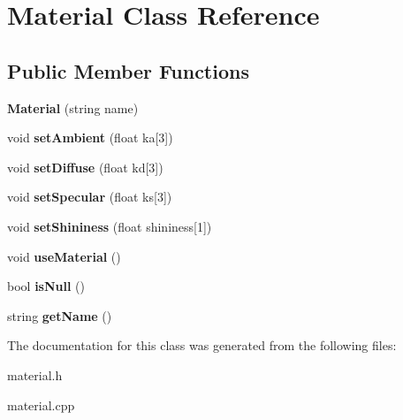 \hypertarget{classMaterial}{\section{Material Class Reference}
\label{classMaterial}
}
\subsection*{Public Member Functions}
\begin{DoxyCompactItemize}
\item 
\hypertarget{classMaterial_a20a0a97e11476bca8682f2c0b4faadec}{{\bfseries Material} (string name)}\label{classMaterial_a20a0a97e11476bca8682f2c0b4faadec}

\item 
\hypertarget{classMaterial_a5fb7d57112c208786d568723e10981f2}{void {\bfseries set\-Ambient} (float ka\mbox{[}3\mbox{]})}\label{classMaterial_a5fb7d57112c208786d568723e10981f2}

\item 
\hypertarget{classMaterial_a010fa9bcbe40a654d3a96ba47eae4101}{void {\bfseries set\-Diffuse} (float kd\mbox{[}3\mbox{]})}\label{classMaterial_a010fa9bcbe40a654d3a96ba47eae4101}

\item 
\hypertarget{classMaterial_a7100af114427c54faae52ffef4bfd873}{void {\bfseries set\-Specular} (float ks\mbox{[}3\mbox{]})}\label{classMaterial_a7100af114427c54faae52ffef4bfd873}

\item 
\hypertarget{classMaterial_ad4ffe84156c202b441f9ebbeb7472f97}{void {\bfseries set\-Shininess} (float shininess\mbox{[}1\mbox{]})}\label{classMaterial_ad4ffe84156c202b441f9ebbeb7472f97}

\item 
\hypertarget{classMaterial_a1774b9bb0d4ec8649963c50b5ec7cd6d}{void {\bfseries use\-Material} ()}\label{classMaterial_a1774b9bb0d4ec8649963c50b5ec7cd6d}

\item 
\hypertarget{classMaterial_aade643f7052b7518816fdbb533cb4849}{bool {\bfseries is\-Null} ()}\label{classMaterial_aade643f7052b7518816fdbb533cb4849}

\item 
\hypertarget{classMaterial_af44af2f5a4db0656907ac6c7288a2dc6}{string {\bfseries get\-Name} ()}\label{classMaterial_af44af2f5a4db0656907ac6c7288a2dc6}

\end{DoxyCompactItemize}


The documentation for this class was generated from the following files\-:\begin{DoxyCompactItemize}
\item 
material.\-h\item 
material.\-cpp\end{DoxyCompactItemize}
